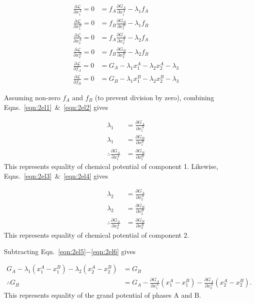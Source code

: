 \documentclass[10pt]{article}
\begin{document}
\begin{align}
  \label{eqn:2el1}
  \frac{\partial\mathcal{L}}{\partial x_1^A} = 0 &= f_A \frac{\partial G_A}{\partial x_1^A} - \lambda_1 f_A\\
  \label{eqn:2el2}
  \frac{\partial\mathcal{L}}{\partial x_1^B} = 0 &= f_B \frac{\partial G_B}{\partial x_1^B} - \lambda_1 f_B\\
  \label{eqn:2el3}
  \frac{\partial\mathcal{L}}{\partial x_2^A} = 0 &= f_A \frac{\partial G_A}{\partial x_2^A} - \lambda_2 f_A\\
  \label{eqn:2el4}
  \frac{\partial\mathcal{L}}{\partial x_2^B} = 0 &= f_B \frac{\partial G_B}{\partial x_2^B} - \lambda_2 f_B\\
  \label{eqn:2el5}
  \frac{\partial\mathcal{L}}{\partial f_A} = 0 &= G_A - \lambda_1 x_1^A - \lambda_2 x_2^A - \lambda_3\\
  \label{eqn:2el6}
  \frac{\partial\mathcal{L}}{\partial f_B} = 0 &= G_B - \lambda_1 x_1^B - \lambda_2 x_2^B - \lambda_3
\end{align}

Assuming non-zero $f_A$ and $f_B$ (to prevent division by zero), combining Eqns.~\ref{eqn:2el1}~\&~\ref{eqn:2el2} gives

\begin{align}
  \lambda_1 &= \frac{\partial G_A}{\partial x_1^A}\\
  \lambda_1 &= \frac{\partial G_B}{\partial x_1^B}\\
  \label{eqn:chempot1}
  \therefore \frac{\partial G_A}{\partial x_1^A} &= \frac{\partial G_B}{\partial x_1^B}
\end{align}
This represents equality of chemical potential of component 1.
Likewise, Eqns.~\ref{eqn:2el3}~\&~\ref{eqn:2el4} gives

\begin{align}
  \lambda_2 &= \frac{\partial G_A}{\partial x_2^A}\\
  \lambda_2 &= \frac{\partial G_B}{\partial x_2^B}\\
  \label{eqn:chempot2}
  \therefore \frac{\partial G_A}{\partial x_2^A} &= \frac{\partial G_B}{\partial x_2^B}
\end{align}
This represents equality of chemical potential of component 2.

Subtracting Eqn.~\ref{eqn:2el5}$-$\ref{eqn:2el6} gives

\begin{align}
  G_A - \lambda_1(x_1^A - x_1^B) - \lambda_2(x_2^A - x_2^B) &= G_B\\
  \label{eqn:grandpot1}
  \therefore G_B &= G_A - \frac{\partial G_A}{\partial x_1^A}(x_1^A - x_1^B) - \frac{\partial G_A}{\partial x_2^A}(x_2^A - x_2^B).
\end{align}
This represents equality of the grand potential of phases A and B.
\end{document}
